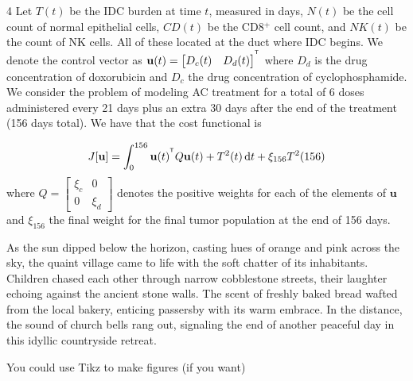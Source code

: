 \documentclass[a0]{4by3}
\newcommand{\NumColumns}{4}
\begin{document}
\begin{minipage}{\linewidth + 2\fboxsep}
\begin{multicols*}{\NumColumns}
 Let $T(t)$ be the IDC burden at time $t$, measured in days, $N(t)$ be the cell count of normal epithelial cells, $CD(t)$ be the CD8$^+$ cell count, and $NK(t)$ be the count of NK cells.
 All of these located at the duct where IDC begins. 
We denote the control vector as $\mathbf{u}(t)=\begin{bmatrix} D_c(t) & D_d(t) \end{bmatrix}^{^{\mathsf T}}$ where $D_d$ is the drug concentration of doxorubicin and $D_c$ the drug concentration of cyclophosphamide.
We consider the problem of modeling AC treatment for a total of 6 doses administered every 21 days plus an extra 30 days after the end of the treatment (156 days total).
We have that the cost functional is 

\begin{align*}
	J[\mathbf{u}] = \int_0^{156}\mathbf{u}(t)^{^{\mathsf T}} Q \mathbf{u}(t)+ T^2(t) \mathop{}\!\mathrm{d} t + \xi_{156} T^2(156)
\end{align*}
where $Q = \begin{bmatrix} \xi_c & 0 \\ 0 & \xi_d \end{bmatrix}$ denotes the positive weights for each of the elements of $\mathbf{u}$ and $ \xi_{156}$ the final weight for the final tumor population at the end of 156 days. 

As the sun dipped below the horizon, casting hues of orange and pink across the sky, the quaint village came to life with the soft chatter of its inhabitants. Children chased each other through narrow cobblestone streets, their laughter echoing against the ancient stone walls. The scent of freshly baked bread wafted from the local bakery, enticing passersby with its warm embrace. In the distance, the sound of church bells rang out, signaling the end of another peaceful day in this idyllic countryside retreat.



            \columnbreak
            You could use Tikz to make figures (if you want)
            

\end{multicols*}
\end{minipage}
\end{document}
